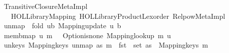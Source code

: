 %
\begin{isabellebody}%
%
%
\isadelimdocument
%
\endisadelimdocument
%
\isatagdocument
%
\isamarkuptrue%
%
\endisatagdocument
{\isafolddocument}%
%
\isadelimdocument
%
\endisadelimdocument
%
\isadelimtheory
%
\endisadelimtheory
%
\isatagtheory
{}\isamarkupfalse%
\ Transitive{\isacharunderscore}{\kern0pt}Closure{\isacharunderscore}{\kern0pt}Meta{\isacharunderscore}{\kern0pt}Impl\isanewline
\ \ \ {\isachardoublequoteopen}HOL{\isacharminus}{\kern0pt}Library{\isachardot}{\kern0pt}Mapping{\isachardoublequoteclose}\ {\isachardoublequoteopen}HOL{\isacharminus}{\kern0pt}Library{\isachardot}{\kern0pt}Product{\isacharunderscore}{\kern0pt}Lexorder{\isachardoublequoteclose}\ Relpow{\isacharunderscore}{\kern0pt}Meta{\isacharunderscore}{\kern0pt}Impl\isanewline
{}%
\endisatagtheory
{\isafoldtheory}%
%
\isadelimtheory
%
\endisadelimtheory
%
\isadelimdocument
%
\endisadelimdocument
%
\isatagdocument
%
\isamarkuptrue%
%
\endisatagdocument
{\isafolddocument}%
%
\isadelimdocument
%
\endisadelimdocument
{}\isamarkupfalse%
\ {\isachardoublequoteopen}un{\isacharunderscore}{\kern0pt}map\ {\isasymequiv}\ fold\ {\isacharparenleft}{\kern0pt}{\isasymlambda}{\isacharparenleft}{\kern0pt}u{\isacharcomma}{\kern0pt}b{\isacharparenright}{\kern0pt}{\isachardot}{\kern0pt}\ Mapping{\isachardot}{\kern0pt}update\ u\ b{\isacharparenright}{\kern0pt}{\isachardoublequoteclose}\isanewline
\isanewline
{}\isamarkupfalse%
\ {\isachardoublequoteopen}memb{\isacharunderscore}{\kern0pt}map\ u\ m\ {\isasymequiv}\ {\isasymnot}\ Option{\isachardot}{\kern0pt}is{\isacharunderscore}{\kern0pt}none\ {\isacharparenleft}{\kern0pt}Mapping{\isachardot}{\kern0pt}lookup\ m\ u{\isacharparenright}{\kern0pt}{\isachardoublequoteclose}\isanewline
\isanewline
{}\isamarkupfalse%
\ un{\isacharunderscore}{\kern0pt}keys{\isacharcolon}{\kern0pt}\ {\isachardoublequoteopen}Mapping{\isachardot}{\kern0pt}keys\ {\isacharparenleft}{\kern0pt}un{\isacharunderscore}{\kern0pt}map\ as\ m{\isacharparenright}{\kern0pt}\ {\isacharequal}{\kern0pt}\ fst\ {\isacharbackquote}{\kern0pt}\ set\ as\ {\isasymunion}\ Mapping{\isachardot}{\kern0pt}keys\ m{\isachardoublequoteclose}\isanewline
%
\isadelimproof
\ \ %
\endisadelimproof
%
\isatagproof
{}\isamarkupfalse%

\end{isabellebody}
